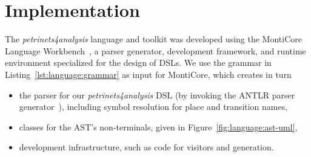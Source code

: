 
\section{Implementation}\label{sec:implementation}

The \emph{petrinets4analysis} language and toolkit was developed using the MontiCore Language Workbench~\cite{rumpe2017monticore}, a parser generator, development framework, and runtime environment specialized for the design of DSLs. We use the grammar in Listing~\ref{lst:language:grammar} as input for MontiCore, which creates in turn~\cite{rumpe2017monticore}
\begin{itemize}
	\item the parser for our \emph{petrinets4analysis} DSL (by invoking the ANTLR parser generator~\cite{parr1995antlr}), including symbol resolution for place and transition names,
	\item classes for the AST's non-terminals, given in Figure~\ref{fig:language:ast-uml},
	\item development infrastructure, such as code for visitors and generation.
\end{itemize}

